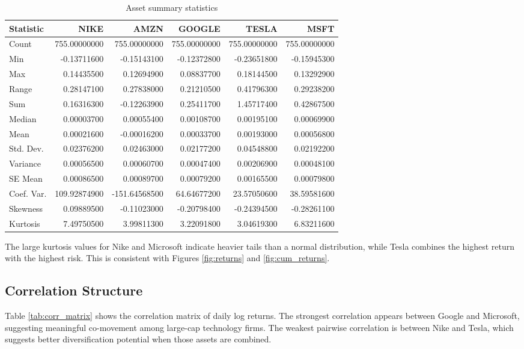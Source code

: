 \documentclass[wcp]{jmlr}
\begin{document}
\begin{table}[H]
\centering
\caption{Asset summary statistics}
\label{tab:asset_summary}
\small
\begin{tabular}{lrrrrr}
\toprule
Statistic & NIKE & AMZN & GOOGLE & TESLA & MSFT \\
\midrule
Count     & 755.00000000 & 755.00000000 & 755.00000000 & 755.00000000 & 755.00000000 \\
Min       & -0.13711600 & -0.15143100 & -0.12372800 & -0.23651800 & -0.15945300 \\
Max       &  0.14435500 &  0.12694900 &  0.08837700 &  0.18144500 &  0.13292900 \\
Range     &  0.28147100 &  0.27838000 &  0.21210500 &  0.41796300 &  0.29238200 \\
Sum       &  0.16316300 & -0.12263900 &  0.25411700 &  1.45717400 &  0.42867500 \\
Median    &  0.00003700 &  0.00055400 &  0.00108700 &  0.00195100 &  0.00069900 \\
Mean      &  0.00021600 & -0.00016200 &  0.00033700 &  0.00193000 &  0.00056800 \\
Std. Dev. &  0.02376200 &  0.02463000 &  0.02177200 &  0.04548800 &  0.02192200 \\
Variance  &  0.00056500 &  0.00060700 &  0.00047400 &  0.00206900 &  0.00048100 \\
SE Mean   &  0.00086500 &  0.00089700 &  0.00079200 &  0.00165500 &  0.00079800 \\
Coef. Var.& 109.92874900 & -151.64568500 & 64.64677200 & 23.57050600 & 38.59581600 \\
Skewness  &  0.09889500 & -0.11023000 & -0.20798400 & -0.24394500 & -0.28261100 \\
Kurtosis  &  7.49750500 &  3.99811300 &  3.22091800 &  3.04619300 &  6.83211600 \\
\bottomrule
\end{tabular}
\end{table}

The large kurtosis values for Nike and Microsoft indicate heavier tails than a normal distribution, while Tesla combines the highest return with the highest risk. This is consistent with Figures \ref{fig:returns} and \ref{fig:cum_returns}.

\subsection{Correlation Structure}

Table \ref{tab:corr_matrix} shows the correlation matrix of daily log returns. The strongest correlation appears between Google and Microsoft, suggesting meaningful co-movement among large-cap technology firms. The weakest pairwise correlation is between Nike and Tesla, which suggests better diversification potential when those assets are combined.
\end{document}

